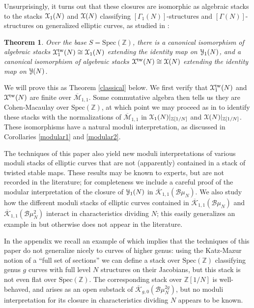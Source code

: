 \documentclass[11pt]{amsart}
\newtheorem{theorem}[subsection]{Theorem}
\theoremstyle{definition}
\begin{document}
Unsurprisingly, it turns out that these closures are isomorphic as algebraic stacks to the stacks ${\mathbf{\EuScript{X}}}_1(N)$ and ${\mathbf{\EuScript{X}}}(N)$ classifying $[\Gamma_1(N)]$-structures and $[\Gamma(N)]$-structures on generalized elliptic curves, as studied in \cite{C}:
\begin{theorem}\label{firstclassical}
Over the base $S = \mathrm{Spec}(\mathbb{Z})$, there is a canonical isomorphism of algebraic stacks ${\mathbf{\EuScript{X}}}_1^{\mathrm{tw}}(N) \cong {\mathbf{\EuScript{X}}}_1(N)$ extending the identity map on ${\mathbf{\EuScript{Y}}}_1(N)$, and a canonical isomorphism of algebraic stacks ${\mathbf{\EuScript{X}}}^{\mathrm{tw}}(N) \cong {\mathbf{\EuScript{X}}}(N)$ extending the identity map on ${\mathbf{\EuScript{Y}}}(N)$.
\end{theorem}
We will prove this as Theorem \ref{classical} below. We first verify that ${\mathbf{\EuScript{X}}}_1^{\mathrm{tw}}(N)$ and ${\mathbf{\EuScript{X}}}^{\mathrm{tw}}(N)$ are finite over $\overline{\mathcal{M}}_{1,1}$. Some commutative algebra then tells us they are Cohen-Macaulay over $\mathrm{Spec}(\mathbb{Z})$, at which point we may proceed as in \cite[\S4.1]{C} to identify these stacks with the normalizations of $\overline{\mathcal{M}}_{1,1}$ in ${\mathbf{\EuScript{X}}}_1(N)|_{\mathbb{Z}[1/N]}$ and ${\mathbf{\EuScript{X}}}(N)|_{\mathbb{Z}[1/N]}$. These isomorphisms have a natural moduli interpretation, as discussed in Corollaries \ref{modular1} and \ref{modular2}.

The techniques of this paper also yield new moduli interpretations of various moduli stacks of elliptic curves that are not (apparently) contained in a stack of twisted stable maps. These results may be known to experts, but are not recorded in the literature; for completeness we include a careful proof of the modular interpretation of the closure of ${\mathbf{\EuScript{Y}}}_1(N)$ in $\overline{\mathcal{K}}_{1,1}({\mathcal{B}} \mu_N)$. We also study how the different moduli stacks of elliptic curves contained in $\overline{\mathcal{K}}_{1,1}({\mathcal{B}}\mu_N)$ and $\overline{\mathcal{K}}_{1,1}({\mathcal{B}}\mu_N^2)$ interact in characteristics dividing $N$; this easily generalizes an example in \cite{AOV2} but otherwise does not appear in the literature. 

In the appendix we recall an example of \cite{CN} which implies that the techniques of this paper do not generalize nicely to curves of higher genus: using the Katz-Mazur notion of a ``full set of sections'' we can define a stack over $\mathrm{Spec}(\mathbb{Z})$ classifying genus $g$ curves with full level $N$ structures on their Jacobians, but this stack is not even flat over $\mathrm{Spec}( \mathbb{Z})$. The corresponding stack over $\mathbb{Z}[1/N]$ is well-behaved, and arises as an open substack of $\overline{\mathcal{K}}_{g,0}({\mathcal{B}}\mu_N^{2g})$, but no moduli interpretation for its closure in characteristics dividing $N$ appears to be known.
\end{document}
